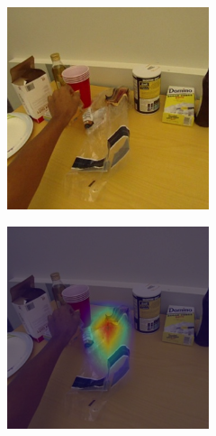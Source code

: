 \documentclass[10pt,twocolumn,hidelinks,letterpaper]{article}
\begin{document}
\begin{figure}
  \centering
  \begin{subfigure}{.24\linewidth}
  	\includegraphics[width=\linewidth]{images/Cams1/S2_take_cheese/rgb0020.png}
  \end{subfigure}
  \begin{subfigure}{.24\linewidth}
  	\includegraphics[width=\linewidth]{images/Cams1/S2_take_cheese/rgb0020_CAM.png}

\end{subfigure}
\end{figure}
\end{document}
